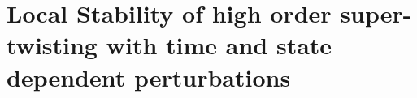 \chapter{Local Stability of high order super-twisting 
         with time and state dependent perturbations}